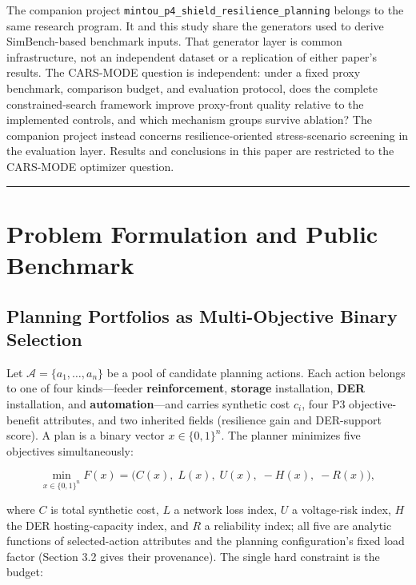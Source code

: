 \documentclass[energies,article,submit,moreauthors]{Definitions/mdpi}
\begin{document}
The companion project \texttt{mintou\_p4\_shield\_resilience\_planning} belongs to the same research program. It and this study share the generators used to derive SimBench-based benchmark inputs. That generator layer is common infrastructure, not an independent dataset or a replication of either paper's results. The CARS-MODE question is independent: under a fixed proxy benchmark, comparison budget, and evaluation protocol, does the complete constrained-search framework improve proxy-front quality relative to the implemented controls, and which mechanism groups survive ablation? The companion project instead concerns resilience-oriented stress-scenario screening in the evaluation layer. Results and conclusions in this paper are restricted to the CARS-MODE optimizer question.

\begin{center}\rule{0.5\linewidth}{0.5pt}\end{center}

\section{Problem Formulation and Public Benchmark}\label{problem-formulation-and-public-benchmark}

\subsection{Planning Portfolios as Multi-Objective Binary Selection}\label{planning-portfolios-as-multi-objective-binary-selection}

Let \(\mathcal{A} = \{a_1, \dots, a_n\}\) be a pool of candidate planning actions. Each action belongs to one of four kinds---feeder \textbf{reinforcement}, \textbf{storage} installation, \textbf{DER} installation, and \textbf{automation}---and carries synthetic cost \(c_i\), four P3 objective-benefit attributes, and two inherited fields (resilience gain and DER-support score). A plan is a binary vector \(x \in \{0,1\}^n\). The planner minimizes five objectives simultaneously:

\[
\min_{x \in \{0,1\}^n} F(x) = \big( C(x),\; L(x),\; U(x),\; -H(x),\; -R(x) \big),
\]

where \(C\) is total synthetic cost, \(L\) a network loss index, \(U\) a voltage-risk index, \(H\) the DER hosting-capacity index, and \(R\) a reliability index; all five are analytic functions of selected-action attributes and the planning configuration's fixed load factor (Section 3.2 gives their provenance). The single hard constraint is the budget:
\end{document}
